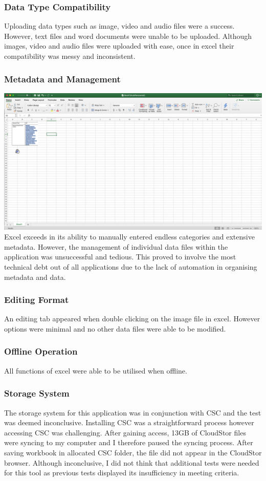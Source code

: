 \documentclass{article}
\begin{document}
\subsubsection{Data Type Compatibility}
Uploading data types such as image, video and audio files were a success. However, text files and word documents were unable to be uploaded. Although images, video and audio files were uploaded with ease, once in excel their compatibility was messy and inconsistent.
\subsubsection{Metadata and Management}
\includegraphics[width=\textwidth]{Excel_Interface.png}
Excel exceeds in its ability to manually entered endless categories and extensive metadata. However, the management of individual data files within the application was unsuccessful and tedious. This proved to involve the most technical debt out of all applications due to the lack of automation in organising metadata and data. 
\subsubsection{Editing Format}
An editing tab appeared when double clicking on the image file in excel. However options were minimal and no other data files were able to be modified. 
\subsubsection{Offline Operation}
All functions of excel were able to be utilised when offline. 
\subsubsection{Storage System}
The storage system for this application was in conjunction with CSC and the test was deemed inconclusive. Installing CSC was a straightforward process however accessing CSC was challenging. After gaining access, 13GB of CloudStor files were syncing to my computer and I therefore paused the syncing process. After saving workbook in allocated CSC folder, the file did not appear in the CloudStor browser. Although inconclusive, I did not think that additional tests were needed for this tool as previous tests displayed its insufficiency in meeting criteria.
\end{document}
